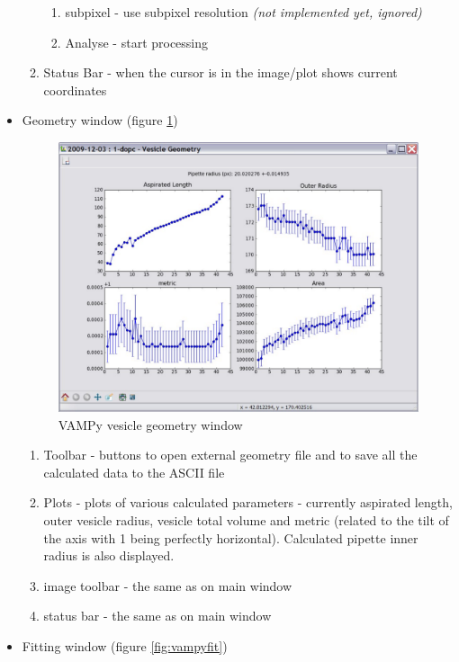 \begin{itemize}
\begin{enumerate}
\begin{enumerate}
						\item subpixel - use subpixel resolution \emph{(not implemented yet, ignored)}
						\item Analyse - start processing 
					\end{enumerate}
				\item Status Bar - when the cursor is in the image/plot shows current coordinates 
		\end{enumerate}
	\item Geometry window (figure \ref{fig:vampygeom})
		\begin{figure}[htbp]
			\centering
			\includegraphics[width=1.00\textwidth]{figs/vampygeom.pdf}
			\caption{VAMPy vesicle geometry window}
			\label{fig:vampygeom}
		\end{figure}
		\begin{enumerate}
			\item Toolbar - buttons to open external geometry file and to save all the calculated data to the ASCII file
			\item Plots - plots of various calculated parameters - currently aspirated length, outer vesicle radius, vesicle total volume and metric (related to the tilt of the axis with 1 being perfectly horizontal). Calculated pipette inner radius is also displayed.
			\item image toolbar - the same as on main window
			\item status bar - the same as on main window
		\end{enumerate}
	\item Fitting window (figure \ref{fig:vampyfit})
		\begin{figure}[htbp]

\end{figure}
\end{itemize}
